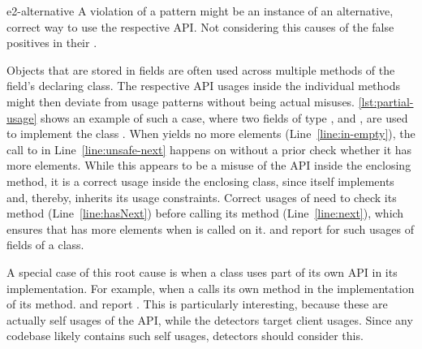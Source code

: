 \begin{obs}{e2-alternative}
  A violation of a pattern might be an instance of an alternative, correct way to use the respective API.
  Not considering this causes  of the false positives in their .
\end{obs}

\vspace{0.03in}
Objects that are stored in fields are often used across multiple methods of the field's declaring class.
The respective API usages inside the individual methods might then deviate from usage patterns without being actual misuses.
\autoref{lst:partial-usage} shows an example of such a case, where two fields of type ,  and , are used to implement the class .
When  yields no more elements (Line~\ref{line:in-empty}), the call to  in Line~\ref{line:unsafe-next} happens on  without a prior check whether it has more elements.
While this appears to be a misuse of the  API inside the enclosing method, it is a correct usage inside the enclosing class, since  itself implements  and, thereby, inherits its usage constraints.
Correct usages of  need to check its  method (Line~\ref{line:hasNext}) before calling its  method (Line~\ref{line:next}), which ensures that  has more elements when  is called on it.
\DMMC and \GROUMiner report  for such usages of fields of a class.
%

A special case of this root cause is when a class uses part of its own API in its implementation.
For example, when a  calls its own  method in the implementation of its  method.
\DMMC and \GROUMiner report .
This is particularly interesting, because these are actually self usages of the API, while the detectors target client usages.
Since any codebase likely contains such self usages, detectors should consider this.

